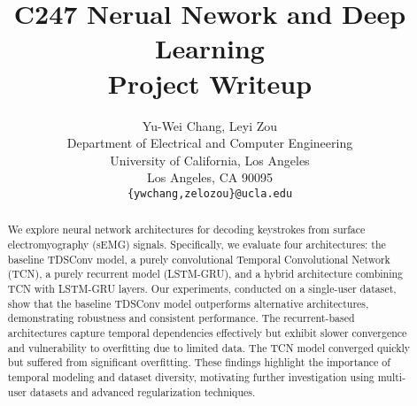 \documentclass{article}
\title{C247 Nerual Nework and Deep Learning\\Project Writeup}
\author{%
  Yu-Wei Chang, Leyi Zou \\
  Department of Electrical and Computer Engineering\\
  University of California, Los Angeles\\
  Los Angeles, CA 90095 \\
  \texttt{\{ywchang,zelozou\}@ucla.edu} \\
}
\begin{document}
\maketitle


\begin{abstract}
    We explore neural network architectures for decoding keystrokes from surface electromyography (sEMG) signals. Specifically, we evaluate four architectures: the baseline TDSConv model, a purely convolutional Temporal Convolutional Network (TCN), a purely recurrent model (LSTM-GRU), and a hybrid architecture combining TCN with LSTM-GRU layers. Our experiments, conducted on a single-user dataset, show that the baseline TDSConv model outperforms alternative architectures, demonstrating robustness and consistent performance. The recurrent-based architectures capture temporal dependencies effectively but exhibit slower convergence and vulnerability to overfitting due to limited data. The TCN model converged quickly but suffered from significant overfitting. These findings highlight the importance of temporal modeling and dataset diversity, motivating further investigation using multi-user datasets and advanced regularization techniques.
\end{abstract}











% 
%
% 
\end{document}
